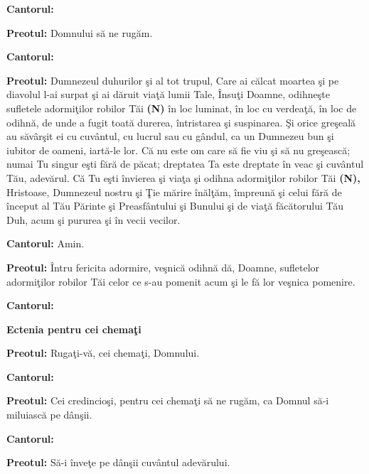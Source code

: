 \documentclass[11pt,letterpaper]{book} \usepackage{ucs}
\newcommand{\mysection}[1]{\begin{center}{\Large \bf #1}\end{center}}
\begin{document}
  {\bf Cantorul:}


  {\bf Preotul:} Domnului să ne rugăm.

  {\bf Cantorul:}
  \begin{center}
  \end{center}

  {\bf Preotul:} Dumnezeul duhurilor şi al tot trupul, Care ai călcat
  moartea şi pe diavolul l-ai surpat şi ai dăruit viaţă lumii Tale,
  Însuţi Doamne, odihneşte sufletele adormiţilor robilor Tăi {\bf (N)}
  în loc luminat, în loc cu verdeaţă, în loc de odihnă, de unde a
  fugit toată durerea, întristarea şi suspinarea. Şi orice greşeală au
  săvârşit ei cu cuvântul, cu lucrul sau cu gândul, ca un Dumnezeu bun
  şi iubitor de oameni, iartă-le lor. Că nu este om care să fie viu şi
  să nu greşească; numai Tu singur eşti fără de păcat; dreptatea Ta
  este dreptate în veac şi cuvântul Tău, adevărul. Că Tu eşti învierea
  şi viaţa şi odihna adormiţilor robilor Tăi {\bf (N),} Hristoase,
  Dumnezeul nostru şi Ţie mărire înălţăm, împreună şi celui fără de
  început al Tău Părinte şi Preasfântului şi Bunului şi de viaţă
  făcătorului Tău Duh, acum şi pururea şi în vecii vecilor.

  {\bf Cantorul:} Amin.

  {\bf Preotul:} Întru fericita adormire, veşnică odihnă dă, Doamne,
  sufletelor adormiţilor robilor Tăi celor ce s-au pomenit acum şi le
  fă lor veşnica pomenire.

  {\bf Cantorul:}


  \mysection{Ectenia pentru cei chemaţi}

  {\bf Preotul:} Rugaţi-vă, cei chemaţi, Domnului.

  {\bf Cantorul:}
  \begin{center}
  \end{center}

  {\bf Preotul:} Cei credincioşi, pentru cei chemaţi să ne rugăm, ca
  Domnul să-i miluiască pe dânşii.

  {\bf Cantorul:}
  \begin{center}
  \end{center}
  \pagebreak

  {\bf Preotul:} Să-i înveţe pe dânşii cuvântul adevărului.
\end{document}
